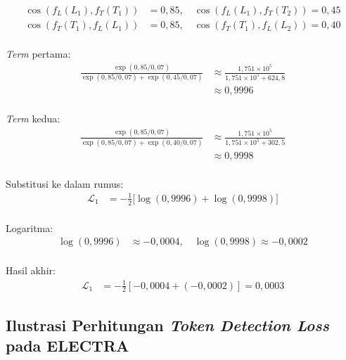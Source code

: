 \begin{align*}
    \cos(f_L(L_1), f_T(T_1)) &= 0{,}85, \quad \cos(f_L(L_1), f_T(T_2)) = 0{,}45 \\
    \cos(f_T(T_1), f_L(L_1)) &= 0{,}85, \quad \cos(f_T(T_1), f_L(L_2)) = 0{,}40\\
\end{align*}

\textit{Term} pertama: \\
\begin{align*}
    \frac{\exp(0{,}85 / 0{,}07)}{\exp(0{,}85 / 0{,}07) + \exp(0{,}45 / 0{,}07)} 
    &\approx \frac{1{,}751 \times 10^5}{1{,}751 \times 10^5 + 624{,}8} \\
    &\approx 0{,}9996\\
\end{align*}

\textit{Term} kedua:\\
\begin{align*}
    \frac{\exp(0{,}85 / 0{,}07)}{\exp(0{,}85 / 0{,}07) + \exp(0{,}40 / 0{,}07)} 
    &\approx \frac{1{,}751 \times 10^5}{1{,}751 \times 10^5 + 302{,}5} \\
    &\approx 0{,}9998\\
\end{align*}

Substitusi ke dalam rumus:\\
\begin{align*}
    \mathcal{L}_1 &= - \frac{1}{2} \bigg[ \log(0{,}9996) + \log(0{,}9998)
    \bigg]\\
\end{align*}

Logaritma:\\
\begin{align*}
    \log(0{,}9996) &\approx -0{,}0004, \quad \log(0{,}9998) \approx -0{,}0002\\
\end{align*}

Hasil akhir:\\
\begin{align*}
    \mathcal{L}_1 &= - \frac{1}{2} \left[ -0{,}0004 + (-0{,}0002) \right] = 0{,}0003
\end{align*}

\subsection{Ilustrasi Perhitungan \textit{Token Detection Loss} pada ELECTRA} \label{subsec:ilustrasi_token_detection_loss_electra}

